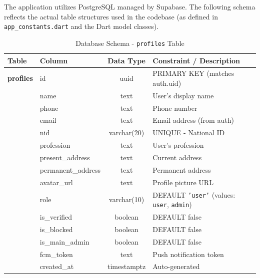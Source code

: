 \documentclass[12pt, a4paper, twoside]{report}
\begin{document}
The application utilizes PostgreSQL managed by Supabase. The following schema reflects the actual table structures used in the codebase (as defined in \texttt{app\_constants.dart} and the Dart model classes).
\begin{table}[ht]
\centering
\caption{Database Schema - \texttt{profiles} Table}
\label{tab:profiles}
\begin{tabularx}{\textwidth}{p{3cm} p{3cm} c X}
\toprule
\textbf{Table} & \textbf{Column} & \textbf{Data Type} & \textbf{Constraint / Description} \\
\midrule
\textbf{profiles} & id & uuid & PRIMARY KEY (matches auth.uid) \\
& name & text & User's display name \\
& phone & text & Phone number \\
& email & text & Email address (from auth) \\
& nid & varchar(20) & UNIQUE - National ID \\
& profession & text & User's profession \\
& present\_address & text & Current address \\
& permanent\_address & text & Permanent address \\
& avatar\_url & text & Profile picture URL \\
& role & varchar(10) & DEFAULT \texttt{'user'} (values: \texttt{user}, \texttt{admin}) \\
& is\_verified & boolean & DEFAULT false \\
& is\_blocked & boolean & DEFAULT false \\
& is\_main\_admin & boolean & DEFAULT false \\
& fcm\_token & text & Push notification token \\
& created\_at & timestamptz & Auto-generated \\
\bottomrule
\end{tabularx}
\end{table}
\end{document}
